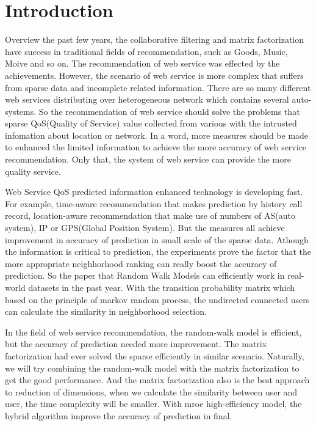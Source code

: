 \documentclass[conference]{IEEEtran}
\begin{document}
\section{Introduction}
\par Overview the past few years, the collaborative filtering and matrix factorization have success in traditional fields of recommendation, such as Goods, Music, Moive and so on. The recommendation of web service was effected by the achievements. However, the scenario of web service is more complex that suffers from sparse data and incomplete related information. There are so many different web services distributing over heterogeneous network which contains several auto-systems. So the recommendation of web service should solve the problems that sparse QoS(Quality of Service) value collected from various with the intrusted infomation about location or network. In a word, more measures should be made to enhanced the limited information to achieve the more accuracy of web service recommendation. Only that, the system of web service can provide the more quality service.
\par Web Service QoS predicted information enhanced technology is developing fast. For example, time-aware recommendation that makes prediction by history call record, location-aware recommendation that make use of numbers of AS(auto system), IP or GPS(Global Position System). But the measures all achieve improvement in accuracy of prediction in small scale of the sparse data. Athough the information is critical to prediction, the experiments prove the factor that the more appropriate neighhorhood ranking can really boost the accuracy of prediction. So the paper that Random Walk Models can efficiently work in real-world datasets in the past year. With the transition probability matrix which based on the principle of markov random process, the undirected connected users can calculate the similarity in neighborhood selection.
\par In the field of web service recommendation, the random-walk model is efficient, but the accuracy of prediction needed more improvement. The matrix factorization had ever solved the sparse efficiently in similar scenario. Naturally, we will try combining the random-walk model with the matrix factorization to get the good performance. And the matrix factorization also is the best approach to reduction of dimensions, when we calculate the similarity between user and user, the time complexity will be smaller. With mroe high-efficiency model, the hybrid algorithm improve the accuracy of prediction in final.
\end{document}
